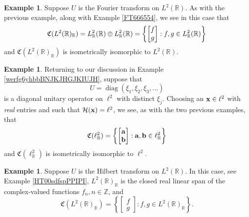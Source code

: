 \documentclass{dis}
\theoremstyle{plain}
\theoremstyle{definition}
\newtheorem{Example}[equation]{Example}
\def\R{\mathbb{R}}
\def\Z{\mathbb{Z}}
\renewcommand{\vec}[1]{{\bf #1}}
\newcommand{\0}{{\color{lightgray}0}}
\begin{document}
\begin{Example}\label{FTexamplesaepaeate}
Suppose $U$ is the Fourier transform on $L^2(\R)$. As with the previous example, along with Example \ref{FT666554}, we see in this case that
$$\frak{C}(L^2(\R)_{\R}) = L^2_{\R}(\R) \oplus L^{2}_{\R}(\R)  =  \left\{\begin{bmatrix} f\\g\end{bmatrix}: f, g \in L^{2}_{\R}(\R)\right\}$$
and $\mathfrak{C}(L^2(\R)_{\R})$ is isometrically isomorphic to $L^2(\R)$. 
\end{Example}

\begin{Example}
Returning to our discussion in Example \ref{werfg6yhbbBNJKJHGJKIUJH}, suppose that 
$$U = \operatorname{diag}(\xi_1, \xi_2, \xi_3, \ldots)$$ is a diagonal unitary operator on $\ell^2$ with distinct $\xi_j$. Choosing an $\vec{x} \in \ell^2$ with {\em real} entries and such that $\mathcal{H}(\vec{x}) = \ell^2$, we see, as with the two previous examples, that
$$\mathfrak{C}(\ell^2_{\R}) =  \left\{\begin{bmatrix} \vec{a}\\\vec{b}\end{bmatrix}: \vec{a}, \vec{b} \in \ell^2_{\R}\right\}$$ and 
$\mathfrak{C}(\ell^2_{\R})$ is isometrically isomorphic to $\ell^2$. 
\end{Example}


\begin{Example}\label{HT664466yY}
Suppose $U$ is the Hilbert transform on $L^2(\R)$. In this case, see Example \ref{HT00sdfspPPIPI}, $L^2(\R)_{\R}$ is the closed real linear span of the complex-valued functions $f_n, n \in \Z$, and
$$\mathfrak{C}(L^2(\R)_{\R}) =  \left\{\begin{bmatrix} f\\g\end{bmatrix}: f, g \in L^{2}(\R)_{\R}\right\}.$$
\end{Example}
\end{document}
